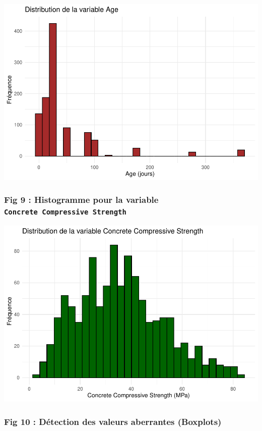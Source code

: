 \documentclass[
  12pt,
]{article}
\begin{document}
\includegraphics{rmd_final_files/figure-latex/unnamed-chunk-30-1.pdf}

\subsubsection{\texorpdfstring{Fig 9 : Histogramme pour la variable
\texttt{Concrete\ Compressive\ Strength}}{Fig 9 : Histogramme pour la variable Concrete Compressive Strength}}\label{fig-9-histogramme-pour-la-variable-concrete-compressive-strength}

\includegraphics{rmd_final_files/figure-latex/unnamed-chunk-31-1.pdf}

\subsubsection{Fig 10 : Détection des valeurs aberrantes
(Boxplots)}\label{fig-10-duxe9tection-des-valeurs-aberrantes-boxplots}
\end{document}
